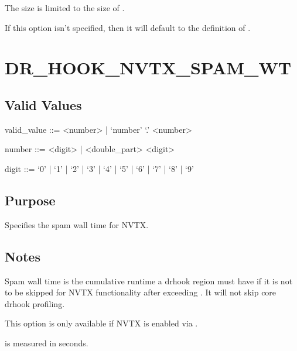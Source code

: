 \documentclass[letterpaper,10pt,english]{sphinxmanual}
\begin{document}
\sphinxAtStartPar
The size is limited to the size of .

\sphinxAtStartPar
If this option isn’t specified, then it will default to the definition of .


\section{DR\_HOOK\_NVTX\_SPAM\_WT}
\label{\detokenize{flag/flag:dr-hook-nvtx-spam-wt}}\label{\detokenize{flag/flag:id238}}

\subsection{Valid Values}
\label{\detokenize{flag/flag:id239}}
\begin{DUlineblock}{0em}
\item[] valid\_value ::= \textless{}number\textgreater{} | ‘number’ ‘.’ \textless{}number\textgreater{}
\item[] number ::= \textless{}digit\textgreater{} | \textless{}double\_part\textgreater{} \textless{}digit\textgreater{}
\item[] digit ::= ‘0’ | ‘1’ | ‘2’ | ‘3’ | ‘4’ | ‘5’ | ‘6’ | ‘7’ | ‘8’ | ‘9’
\end{DUlineblock}


\subsection{Purpose}
\label{\detokenize{flag/flag:id240}}
\sphinxAtStartPar
Specifies the spam wall time for NVTX.


\subsection{Notes}
\label{\detokenize{flag/flag:id241}}
\sphinxAtStartPar
Spam wall time is the cumulative runtime a drhook region must have if it is not to be skipped for NVTX functionality after exceeding {\hyperref[\detokenize{flag/flag:dr-hook-nvtx-spam-call-count}]{}}. It will not skip core drhook profiling.

\sphinxAtStartPar
This option is only available if NVTX is enabled via {\hyperref[\detokenize{flag/flag:dr-hook-nvtx}]{}}.

\sphinxAtStartPar
{\hyperref[\detokenize{flag/flag:dr-hook-nvtx-spam-wt}]{}} is measured in seconds.
\end{document}
